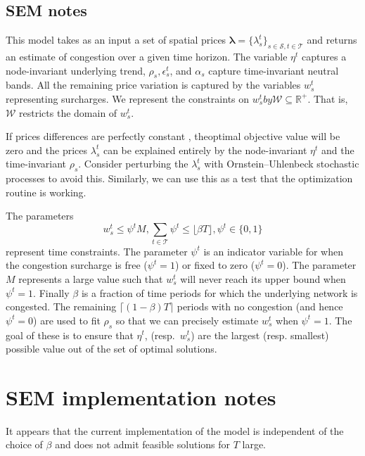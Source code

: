 \documentclass[11pt, letterpaper,nounbold]{article}
\renewcommand{\S}{\mathcal{S}}
\newcommand{\T}{\mathcal{T}}
\begin{document}
\subsection{SEM notes}
This model takes as an input a set of spatial prices $\pmb{\lambda} = \{\lambda_{s}^{t}\}_{s\in \S, t\in \T}$ and returns an estimate of congestion over a given time horizon. The variable $\eta^{t}$ captures a node-invariant underlying trend, $\rho_{s}, \epsilon_{s}^{t}$, and $\alpha_{s}$ capture time-invariant neutral bands. All the remaining price variation is captured by the variables $w_{s}^{t}$ representing surcharges. We represent the constraints on $w_{s}^{t} by \mathcal{W}\subseteq \mathbb{R}^{+}$. That is, $\mathcal{W}$ restricts the domain of $w_{s}^{t}$.

If prices differences are perfectly constant , theoptimal objective value will be zero and the prices $\lambda_{s}^{t}$ can be explained entirely by the node-invariant $\eta^{t}$ and the time-invariant $\rho_{s}$. Consider perturbing the $\lambda_{s}^{t}$ with Ornstein--Uhlenbeck stochastic processes to avoid this. Similarly, we can use this as a test that the optimization routine is working.

The parameters
	\[w_{s}^{t} \leq \psi^{t} M, \sum_{t\in \T} \psi^{t} \leq \lfloor \beta T\rfloor, \psi^{t} \in \{0,1\}\]
represent time constraints. The parameter $\psi^{t}$ is an indicator variable for when the congestion surcharge is free ($\psi^{t} =1$) or fixed to zero ($\psi^{t} = 0$). The parameter $M$ represents a large value such that $w_{s}^{t}$ will never reach its upper bound when $\psi^{t} = 1$. Finally $\beta$ is a fraction of time periods for which the underlying network is congested. The remaining $\lceil (1-\beta) T\rceil$ periods with no congestion (and hence $\psi^{t} = 0$) are used to fit $\rho_{s}$  so that we can precisely estimate $w_{s}^{t}$ when $\psi^{t} = 1$. The goal of these is to ensure that $\eta^{t}$, (resp.~$w_{s}^{t}$) are the largest (resp. smallest) possible value out of the set of optimal solutions.
\section{SEM implementation notes}
It appears that the current implementation of the model is independent of the choice of $\beta$ and does not admit feasible solutions for $T$ large.


\end{document}
